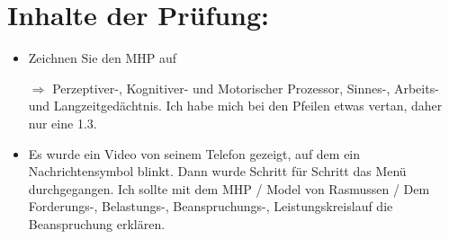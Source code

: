 \documentclass[a4paper]{article}
\begin{document}
\section*{Inhalte der Prüfung:}


    \begin{itemize}
        \item Zeichnen Sie den MHP auf
        \item[$\Rightarrow$] Perzeptiver-, Kognitiver- und Motorischer Prozessor,
             Sinnes-, Arbeits- und Langzeitgedächtnis. Ich habe mich bei den
             Pfeilen etwas vertan, daher nur eine 1.3.
        \item Es wurde ein Video von seinem Telefon gezeigt, auf dem ein
              Nachrichtensymbol blinkt. Dann wurde Schritt für Schritt das Menü
              durchgegangen. Ich sollte mit dem MHP / Model von Rasmussen / Dem
              Forderungs-, Belastungs-, Beanspruchungs-, Leistungskreislauf
              die Beanspruchung erklären.
    \end{itemize}
\end{document}
